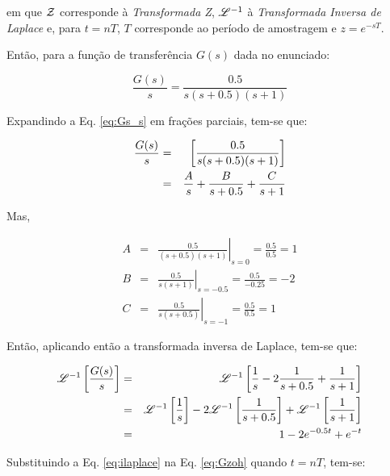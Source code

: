 \noindent em que $\mathcal{Z}$ corresponde à {\it Transformada Z}, $\mathscr{L}^{-1}$ à {\it
Transformada Inversa de Laplace} e, para $t = nT$, $T$ corresponde ao período de
amostragem e $z = e^{-sT}$.

Então, para a função de transferência $G(s)$ dada no enunciado:

\begin{equation}\label{eq:Gs_s}
\frac{G(s)}{s} = \frac{0.5}{s(s+0.5)(s+1)}
\end{equation}

Expandindo a Eq. \ref{eq:Gs_s} em frações parciais, tem-se que:

\begin{eqnarray}\label{eq:frac_parc}
\frac{G(s)}{s} & = & \left[\frac{0.5}{s(s+0.5)(s+1)}\right]\nonumber\\
& = & \frac{A}{s} + \frac{B}{s+0.5} + \frac{C}{s+1}\nonumber\\
\end{eqnarray}

Mas,

\begin{eqnarray}
A & = & \left.\frac{0.5}{(s+0.5)(s+1)}\right|_{s = 0} = \frac{0.5}{0.5} = 
                                                    1\nonumber\\
B & = & \left.\frac{0.5}{s(s+1)}\right|_{s = -0.5} = \frac{0.5}{-0.25} = 
                                                 -2\nonumber\\
C & = & \left.\frac{0.5}{s(s+0.5)}\right|_{s = -1} = \frac{0.5}{0.5} = 
                                                     1\nonumber
\end{eqnarray}

Então, aplicando então a transformada inversa de Laplace, tem-se que:

\begin{eqnarray}
\mathscr{L}^{-1}\left[\frac{G(s)}{s}\right]
& = & \mathscr{L}^{-1}\left[\frac{1}{s} - 
                         2\frac{1}{s+0.5} + 
                         \frac{1}{s+1}\right]\nonumber\\
& = & \mathscr{L}^{-1}\left[\frac{1}{s}\right] - 
      2\mathscr{L}^{-1}\left[\frac{1}{s+0.5}\right] + 
      \mathscr{L}^{-1}\left[\frac{1}{s+1}\right]\nonumber\\
& = & 1 - 2e^{-0.5t} + e^{-t}\label{eq:ilaplace}
\end{eqnarray}

Substituindo a Eq. \ref{eq:ilaplace} na Eq. \ref{eq:Gzoh} quando $t = nT$,
tem-se:

